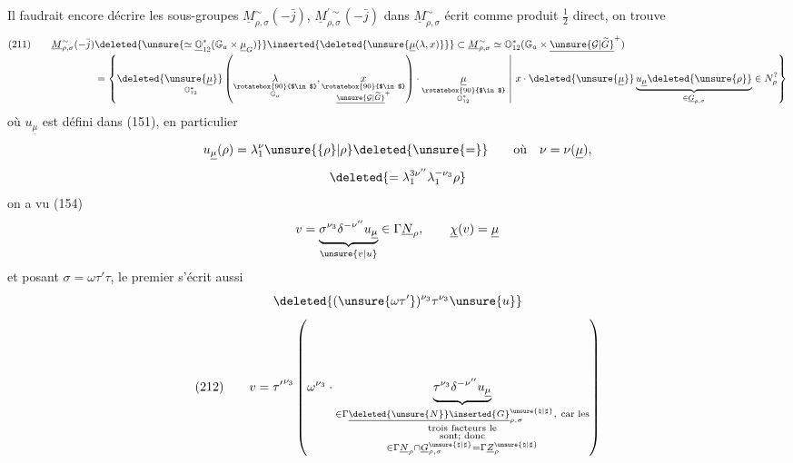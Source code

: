 Il faudrait encore décrire les sous-groupes
$\underline M_{\rho,\sigma}^{\sim}(-\bar j)$,
$\underline M_{\rho,\sigma}^{\prime\sim}(-\bar j)$
dans $\underline M_{\rho,\sigma}^{\sim}$ écrit comme produit
$\frac12$ direct, on trouve
\[
\begin{aligned}
(211)\qquad
\underline M_{\rho,\sigma}^{\sim}(-\bar j)
&\deleted{\unsure{\simeq\underline{\mathbb O}_{12}^{*}
(\mathbb G_a\times\underline\mu_G)}}
\inserted{\deleted{\unsure{\underline\mu(\lambda,x)}}}
\subset \underline M_{\rho,\sigma}^{\sim}
\simeq \mathbb O_{12}^{*}
(\mathbb G_a\times\underline{\unsure{\mathcal G|\widetilde G}}^{+})
\\[-1pt]
&=\left\{
\deleted{\underset{\mathbb O_{12}^{*}}
{\unsure{\underline\mu}}}
\left(
\underset{\substack{\rotatebox{90}{$\in$}\\\mathbb G_a}}{\lambda},
\underset{\substack{\rotatebox{90}{$\in$}\\
\underline{\unsure{\mathcal G|\widetilde G}}^{+}}}{x}
\right)\cdot
\underset{\substack{\rotatebox{90}{$\in$}\\
\mathbb O_{12}^{*}}}{\underline\mu}
\ \middle|\ x\cdot\deleted{\unsure{\underline\mu}}
\underbrace{u_{\underline\mu}\deleted{\unsure{\rho}}}
_{\in\underline G_{\rho,\sigma}}
\in N_\rho^{?}\right\}
\end{aligned}
\]
où $u_{\underline\mu}$ est défini dans (151), en particulier
\[
u_{\underline\mu}(\rho)=\lambda_1^{\nu}
\unsure{\{\rho\}|\rho}\deleted{\unsure{=}}
\qquad\text{où}\quad \nu=\nu(\underline\mu),
\]
\[
\deleted{=\lambda_1^{3\nu''}\lambda_1^{-\nu_3}\rho}
\]
on a vu (154)
\[
v=\underbrace{\sigma^{\nu_3}\delta^{-\nu''}u_{\underline\mu}}
_{\unsure{v|u}}\in\Gamma\underline N_\rho,
\qquad \underline\chi(v)=\underline\mu
\]
et posant $\sigma=\omega\tau'\tau$, le premier
 s'écrit aussi
\[
\deleted{(\unsure{\omega\tau'})^{\nu_3}\tau^{\nu_3}\unsure{u}}
\]
\[
(212)\qquad
v={\tau'}^{\nu_3}\left(\omega^{\nu_3}\cdot
\underbrace{\tau^{\nu_3}\delta^{-\nu''}u_{\underline\mu}}
_{\substack{
\in\Gamma\underline{\deleted{\unsure{N}}\inserted{G}}
_{\rho,\sigma}^{\unsure{\natural|\sharp}},\ \text{car les}\\
\text{trois facteurs le}\\
\text{sont; donc}\\
\in\Gamma\underline N_\rho\cap
\underline G_{\rho,\sigma}^{\unsure{\natural|\sharp}}
=\Gamma\underline Z_\rho^{\unsure{\natural|\sharp}}
}}\right)
\]

